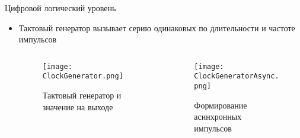 \documentclass[aspectratio=169,14pt]{beamer}
\begin{document}
\begin{frame}{Цифровой логический уровень}
    \begin{itemize}
        \item Тактовый генератор вызывает серию одинаковых по длительности и частоте импульсов
            \begin{itemize}
            \end{itemize}
            \begin{columns}[T,onlytextwidth]
                \begin{column}{0.66\textwidth}
                    \begin{figure}[htp]
                        \centering
                        \texttt{[image: ClockGenerator.png]}
                        \caption{\tiny{Тактовый генератор и значение на выходе}}
                    \end{figure}
                \end{column}
                \begin{column}{0.33\textwidth}
                    \begin{figure}[htp]
                        \centering
                        \texttt{[image: ClockGeneratorAsync.png]}
                        \caption{\tiny{Формирование асинхронных импульсов}}
                    \end{figure}
                \end{column}
            \end{columns}
    \end{itemize}
\end{frame}
\end{document}
